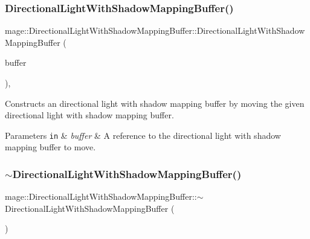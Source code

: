 \subsubsection{\texorpdfstring{Directional\+Light\+With\+Shadow\+Mapping\+Buffer()}{DirectionalLightWithShadowMappingBuffer()}\hspace{0.1cm}{\footnotesize\ttfamily [3/3]}}
{\footnotesize\ttfamily mage\+::\+Directional\+Light\+With\+Shadow\+Mapping\+Buffer\+::\+Directional\+Light\+With\+Shadow\+Mapping\+Buffer (\begin{DoxyParamCaption}\item[{\hyperlink{structmage_1_1_directional_light_with_shadow_mapping_buffer}{Directional\+Light\+With\+Shadow\+Mapping\+Buffer} \&\&}]{buffer }\end{DoxyParamCaption})\hspace{0.3cm}{\ttfamily [default]}, {\ttfamily [noexcept]}}

Constructs an directional light with shadow mapping buffer by moving the given directional light with shadow mapping buffer.


\begin{DoxyParams}[1]{Parameters}
\mbox{\tt in}  & {\em buffer} & A reference to the directional light with shadow mapping buffer to move. \\
\hline
\end{DoxyParams}
\hypertarget{structmage_1_1_directional_light_with_shadow_mapping_buffer_aaf69f9a370b547844fe51ccebc791876}{}\label{structmage_1_1_directional_light_with_shadow_mapping_buffer_aaf69f9a370b547844fe51ccebc791876} 
\subsubsection{\texorpdfstring{$\sim$\+Directional\+Light\+With\+Shadow\+Mapping\+Buffer()}{~DirectionalLightWithShadowMappingBuffer()}}
{\footnotesize\ttfamily mage\+::\+Directional\+Light\+With\+Shadow\+Mapping\+Buffer\+::$\sim$\+Directional\+Light\+With\+Shadow\+Mapping\+Buffer (\begin{DoxyParamCaption}{ }\end{DoxyParamCaption})\hspace{0.3cm}{\ttfamily [default]}}

